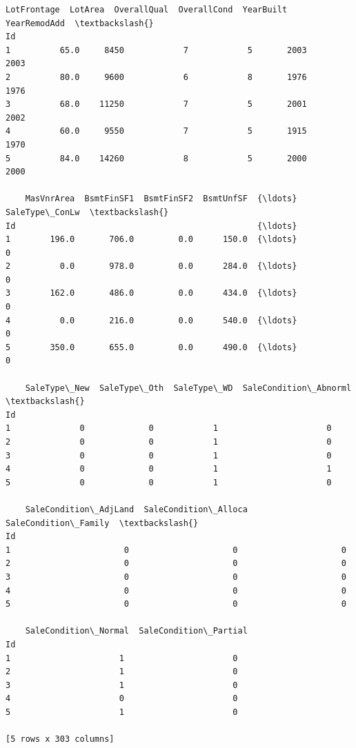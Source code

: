 \documentclass[11pt]{article}
\makeatletter
\newcommand{\boxspacing}{\kern\kvtcb@left@rule\kern\kvtcb@boxsep}
\newcommand{\prompt}[4]{
        \ttfamily\llap{{\color{#2}[#3]:\hspace{3pt}#4}}\vspace{-\baselineskip}
    }
\makeatother
\begin{document}
            \begin{tcolorbox}[breakable, size=fbox, boxrule=.5pt, pad at break*=1mm, opacityfill=0]
\prompt{Out}{outcolor}{344}{\boxspacing}
\begin{Verbatim}[commandchars=\\\{\}]
    LotFrontage  LotArea  OverallQual  OverallCond  YearBuilt  YearRemodAdd  \textbackslash{}
Id
1          65.0     8450            7            5       2003          2003
2          80.0     9600            6            8       1976          1976
3          68.0    11250            7            5       2001          2002
4          60.0     9550            7            5       1915          1970
5          84.0    14260            8            5       2000          2000

    MasVnrArea  BsmtFinSF1  BsmtFinSF2  BsmtUnfSF  {\ldots}  SaleType\_ConLw  \textbackslash{}
Id                                                 {\ldots}
1        196.0       706.0         0.0      150.0  {\ldots}               0
2          0.0       978.0         0.0      284.0  {\ldots}               0
3        162.0       486.0         0.0      434.0  {\ldots}               0
4          0.0       216.0         0.0      540.0  {\ldots}               0
5        350.0       655.0         0.0      490.0  {\ldots}               0

    SaleType\_New  SaleType\_Oth  SaleType\_WD  SaleCondition\_Abnorml  \textbackslash{}
Id
1              0             0            1                      0
2              0             0            1                      0
3              0             0            1                      0
4              0             0            1                      1
5              0             0            1                      0

    SaleCondition\_AdjLand  SaleCondition\_Alloca  SaleCondition\_Family  \textbackslash{}
Id
1                       0                     0                     0
2                       0                     0                     0
3                       0                     0                     0
4                       0                     0                     0
5                       0                     0                     0

    SaleCondition\_Normal  SaleCondition\_Partial
Id
1                      1                      0
2                      1                      0
3                      1                      0
4                      0                      0
5                      1                      0

[5 rows x 303 columns]
\end{Verbatim}
\end{tcolorbox}
        
\end{document}
